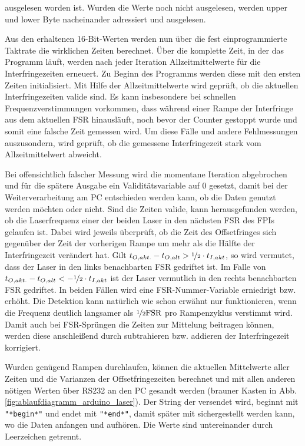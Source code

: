 ausgelesen worden ist. Wurden die Werte noch nicht ausgelesen, werden upper und
lower Byte nacheinander adressiert und ausgelesen.\par
Aus den erhaltenen 16-Bit-Werten werden nun über die fest einprogrammierte
Taktrate die wirklichen Zeiten berechnet. Über die komplette Zeit, in der das
Programm läuft, werden nach jeder Iteration Allzeitmittelwerte für die
Interfringezeiten erneuert. Zu Beginn des Programms werden diese mit den ersten
Zeiten initialisiert. Mit Hilfe der Allzeitmittelwerte wird geprüft, ob die
aktuellen Interfringezeiten valide sind. Es kann insbesondere bei schnellen
Frequenzverstimmungen vorkommen, dass während einer Rampe der Interfringe aus
dem aktuellen FSR hinausläuft, noch bevor der Counter gestoppt wurde und
somit eine falsche Zeit gemessen wird. Um diese Fälle und andere Fehlmessungen
auszusondern, wird geprüft, ob die gemessene Interfringezeit stark vom
Allzeitmittelwert abweicht.\par
Bei offensichtlich falscher Messung wird die
momentane Iteration abgebrochen und für die spätere Ausgabe ein
Validitätsvariable auf 0 gesetzt, damit bei der Weiterverarbeitung am PC
entschieden werden kann, ob die Daten genutzt werden möchten oder nicht. Sind
die Zeiten valide, kann herausgefunden werden, ob die Laserfrequenz einer der beiden Laser
in den nächsten FSR des FPIs gelaufen ist. Dabei wird jeweils überprüft, ob die
Zeit des Offsetfringes sich gegenüber der Zeit der vorherigen Rampe um mehr als
die Hälfte der Interfringezeit verändert hat. Gilt
$t_{O,akt.}-t_{O,alt}>\nicefrac{1}{2}\cdot t_{I,akt}$, so wird vermutet, dass
der Laser in den links benachbarten FSR gedriftet ist. Im Falle von
$t_{O,akt.}-t_{O,alt}<-\nicefrac{1}{2}\cdot t_{I,akt}$ ist der Laser vermutlich
in den rechts benachbarten FSR gedriftet. In beiden Fällen wird eine
FSR-Nummer-Variable erniedrigt bzw. erhöht. Die Detektion kann natürlich wie
schon erwähnt nur funktionieren, wenn die Frequenz deutlich langsamer als
$\nicefrac{1}{2}\text{FSR}$ pro Rampenzyklus verstimmt wird. Damit auch bei
FSR-Sprüngen die Zeiten zur Mittelung beitragen können, werden diese
anschleißend durch subtrahieren bzw. addieren der Interfringezeit
korrigiert.\par
Wurden genügend Rampen durchlaufen, können die aktuellen Mittelwerte aller
Zeiten und die Varianzen der Offsetfringezeiten berechnet und mit allen anderen
nötigen Werten über RS232 an den PC gesandt werden (brauner Kasten in Abb.
\ref{fig:ablaufdiagramm_arduino_laser}). Der String der versendet wird, beginnt
mit \lstinline|"*begin*"| und endet mit \lstinline|"*end*"|, damit später mit
sichergestellt werden kann, wo die Daten anfangen und aufhören. Die Werte sind
untereinander durch Leerzeichen getrennt.

